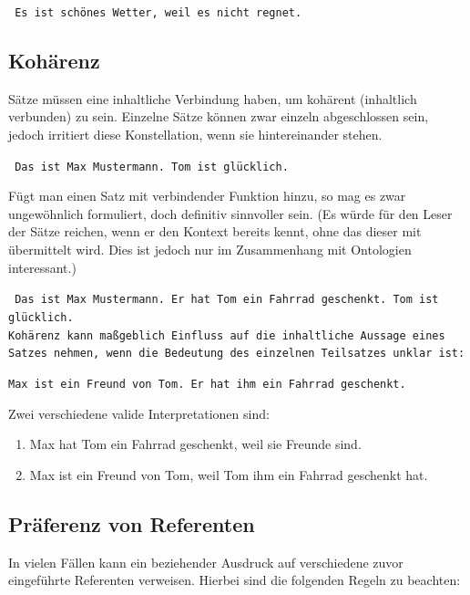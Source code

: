 \documentclass[12pt]{report}
\begin{document}
\tt 
Es ist schönes Wetter, weil es nicht regnet.
\rm

\subsection{Kohärenz}
Sätze müssen eine inhaltliche Verbindung haben, um kohärent (inhaltlich verbunden) zu sein. Einzelne Sätze können zwar einzeln abgeschlossen sein, jedoch irritiert diese Konstellation, wenn sie hintereinander stehen. 

\tt 
Das ist Max Mustermann. Tom ist glücklich.
\rm

Fügt man einen Satz mit verbindender Funktion hinzu, so mag es zwar ungewöhnlich formuliert, doch definitiv sinnvoller sein. (Es würde für den Leser der Sätze reichen, wenn er den Kontext bereits kennt, ohne das dieser mit übermittelt wird. Dies ist jedoch nur im Zusammenhang mit Ontologien interessant.)

\tt 
Das ist Max Mustermann. Er hat Tom ein Fahrrad geschenkt. Tom ist glücklich.
\\ \rm
Kohärenz kann maßgeblich Einfluss auf die inhaltliche Aussage eines Satzes nehmen, wenn die Bedeutung des einzelnen Teilsatzes unklar ist:

\tt Max ist ein Freund von Tom. Er hat ihm ein Fahrrad geschenkt. 

\rm

Zwei verschiedene valide Interpretationen sind:

\begin{enumerate}
\item Max hat Tom ein Fahrrad geschenkt, weil sie Freunde sind.
\item Max ist ein Freund von Tom, weil Tom ihm ein Fahrrad geschenkt hat. 
\end{enumerate}

\subsection{Präferenz von Referenten}
In vielen Fällen kann ein beziehender Ausdruck auf verschiedene zuvor eingeführte Referenten verweisen. Hierbei sind die folgenden Regeln zu beachten:
\end{document}
